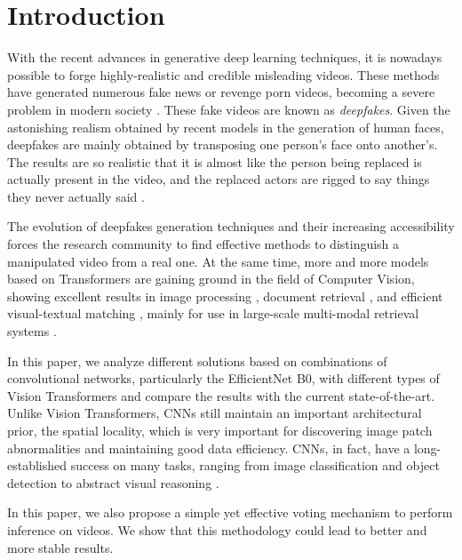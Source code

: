 \documentclass[runningheads]{llncs}
\begin{document}
\section{Introduction}
With the recent advances in generative deep learning techniques, it is nowadays possible to forge highly-realistic and credible misleading videos. These methods have generated numerous fake news or revenge porn videos, becoming a severe problem in modern society \cite{looming}. 
These fake videos are known as \textit{deepfakes}.
Given the astonishing realism obtained by recent models in the generation of human faces, deepfakes are mainly obtained by transposing one person's face onto another's. The results are so realistic that it is almost like the person being replaced is actually present in the video, and the replaced actors are rigged to say things they never actually said \cite{tolosana2020deepfakes}.

The evolution of deepfakes generation techniques and their increasing accessibility forces the research community to find effective methods to distinguish a manipulated video from a real one. At the same time, more and more models based on Transformers are gaining ground in the field of Computer Vision, showing excellent results in image processing \cite{khan2021transformers,han2020survey}, document retrieval \cite{macavaney2020efficient}, and efficient visual-textual matching  \cite{messina2020fine,messina2021transformer}, mainly for use in large-scale multi-modal retrieval systems \cite{amato2021visione,messina2021towards}.

In this paper, we analyze different solutions based on combinations of convolutional networks, particularly the EfficientNet B0, with different types of Vision Transformers and compare the results with the current state-of-the-art. Unlike Vision Transformers, CNNs still maintain an important architectural prior, the spatial locality, which is very important for discovering image patch abnormalities and maintaining good data efficiency. CNNs, in fact, have a long-established success on many tasks, ranging from image classification \cite{foret2020sharpness,xie2017aggregated} and object detection \cite{redmon2018yolov3,amato2019learning,ciampi2020virtual} to abstract visual reasoning \cite{messina2019testing,messina2021solving}.

In this paper, we also propose a simple yet effective voting mechanism to perform inference on videos. We show that this methodology could lead to better and more stable results.
\end{document}

